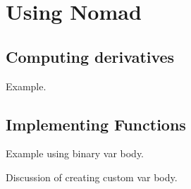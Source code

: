 \chapter{Using Nomad}

\section{Computing derivatives}

Example.

\section{Implementing Functions}

Example using binary var body.

Discussion of creating custom var body.
